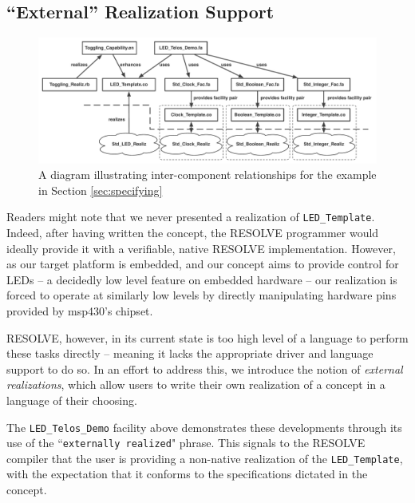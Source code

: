 \documentclass{sig-alternate}
\begin{document}
\subsection{``External'' Realization Support}
\label{ssec:external}

\begin{figure}[!htb]
\centering
\includegraphics[scale=.55]{figs/component_graph.pdf}
\caption{A diagram illustrating inter-component relationships for the example in Section \ref{sec:specifying}}
\end{figure}
\label{fig:imp}


Readers might note that we never presented a realization of \texttt{LED\_Template}. Indeed, after having written the concept, the RESOLVE programmer would ideally provide it with a verifiable, native RESOLVE implementation. However, as our target platform is embedded, and our concept aims to provide control for LEDs -- a decidedly low level feature on embedded hardware -- our realization is forced to operate at similarly low levels by directly manipulating hardware pins provided by msp430's chipset. 

RESOLVE, however, in its current state is too high level of a language to perform these tasks directly -- meaning it lacks the appropriate driver and language support to do so. In an effort to address this, we introduce the notion of \textit{external realizations}, which allow users to write their own realization of a concept in a language of their choosing.

The \texttt{LED\_Telos\_Demo} facility above demonstrates these developments through its use of the ``\texttt{externally realized}" phrase. This signals to the RESOLVE compiler that the user is providing a non-native realization of the \texttt{LED\_Template}, with the expectation that it conforms to the specifications dictated in the concept. 


\end{document}
